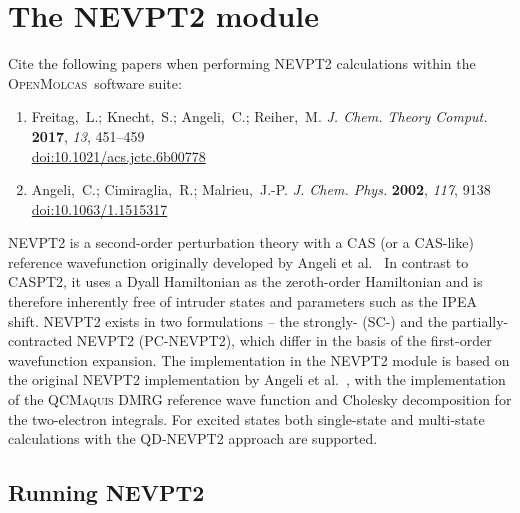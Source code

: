 \documentclass[bibliography=totoc,12pt,a4paper]{scrartcl}
\newcommand{\mol}{\textsc{OpenMolcas}}
\newcommand{\qcm}{\textsc{QCMaquis}}
\newcommand{\hostp}{\mol}
\begin{document}
\section{The NEVPT2 module}\label{sec:nevpt2}

\begin{framed}
 \noindent Cite the following papers when performing NEVPT2 calculations within the \hostp\ software suite:
\begin{enumerate}
\item Freitag,~L.; Knecht,~S.; Angeli,~C.; Reiher,~M. \emph{J. Chem. Theory Comput.}
  \textbf{2017}, \emph{13}, 451--459\\ \href{https://doi.org/10.1021/acs.jctc.6b00778}{doi:10.1021/acs.jctc.6b00778}
\item Angeli,~C.; Cimiraglia,~R.; Malrieu,~J.-P. \emph{J. Chem. Phys.} \textbf{2002},
  \emph{117}, 9138\\ \href{https://doi.org/10.1063/1.1515317}{doi:10.1063/1.1515317}
\end{enumerate}
\end{framed}

NEVPT2 is a second-order perturbation theory with a CAS (or a CAS-like) reference wavefunction originally developed by Angeli et al.~\cite{Angeli_JChemPhys_Introduction_2001,Angeli_ChemPhysLett_Nelectron_2001,Angeli_JChemPhys_nelectron_2002,Angeli_JChemPhys_quasidegenerate_2004} In contrast to CASPT2, it uses a Dyall Hamiltonian\cite{Dyall_JChemPhys_choice_1995} as the zeroth-order Hamiltonian and is therefore inherently free of intruder states and parameters such as the IPEA shift. NEVPT2 exists in two formulations -- the strongly- (SC-) and the partially-contracted NEVPT2 (PC-NEVPT2), which differ in the basis of the first-order wavefunction expansion. The implementation in the NEVPT2 module is based on the original NEVPT2 implementation by Angeli et al.~\cite{Angeli_JChemPhys_nelectron_2002,Angeli_JChemPhys_quasidegenerate_2004}, with the implementation of the \qcm{} DMRG reference wave function and Cholesky decomposition for the two-electron integrals\cite{chimia,Freitag_JChemTheoryComput_Multireference_2017}. For excited states both single-state and multi-state calculations with the QD-NEVPT2 approach\cite{Angeli_JChemPhys_quasidegenerate_2004} are supported.

\subsection{Running NEVPT2}
\end{document}
